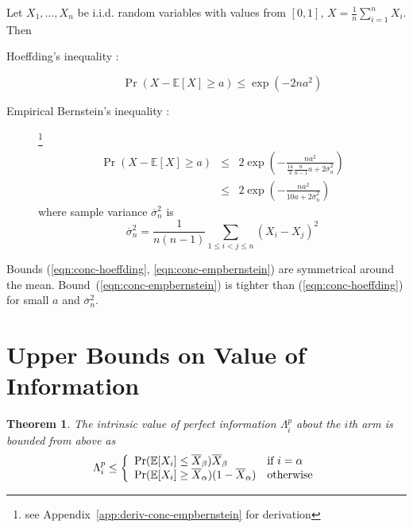 \documentclass{article}
\newcommand {\IE} {\ensuremath {\mathbb{E}}}
\newtheorem{thm}{Theorem}
\begin{document}
Let $X_1, \ldots, X_n$ be i.i.d. random variables with values from $[0,1]$,
$X=\frac 1 n \sum_{i=1}^n X_i$. Then 
\begin{description}
\item[Hoeffding's inequality \rm{\cite{Hoeffding.ineq}}:] 
\begin{equation}
\Pr(X-\IE[X] \ge a) \le \exp ( -2na^2)
\label{eqn:conc-hoeffding}
\end{equation}
\item[Empirical Bernstein's inequality
  \rm{\cite{MaurerPontil.benrstein}}:]\footnote{see
    Appendix~\ref{app:deriv-conc-empbernstein} for derivation}
\begin{eqnarray}
\Pr(X-\IE[X] \ge a) &\le& 2\exp \left( - \frac {na^2} {\frac {14} {3}
                          \frac {n} {n-1}a+2\overline\sigma_n^2}\right)\nonumber\\
                    &\le& 2\exp \left( - \frac {na^2} {10a+2\overline\sigma_n^2}\right)
\label{eqn:conc-empbernstein}
\end{eqnarray}
where sample variance $\overline\sigma_n^2$ is
\begin{equation}
\overline\sigma_n^2=\frac 1 {n(n-1)} \sum_{1\le i < j\le n}(X_i-X_j)^2
\label{eqn:sample-variance}
\end{equation}
\end{description}
Bounds (\ref{eqn:conc-hoeffding}, \ref{eqn:conc-empbernstein}) are symmetrical
around the mean. Bound~(\ref{eqn:conc-empbernstein}) is tighter than
(\ref{eqn:conc-hoeffding}) for small $a$ and $\overline\sigma_n^2$. 

\section{Upper Bounds on Value of Information}

\begin{thm} The intrinsic value of perfect information $\Lambda_i^p$ about the $i$th arm is
  bounded from above as
\begin{equation}
  \Lambda_i^p \le \left\{
  \begin{array}{l l}
    \Pr(\IE[X_i] \le \overline X_\beta)\overline X_\beta & \mbox{if $i=\alpha$} \\
    \Pr(\IE[X_i] \ge \overline X_\alpha)(1-\overline X_\alpha) & \mbox{otherwise}
  \end{array} \right.
\label{eqn:thm-vopi}
\end{equation}
\end{thm}
\end{document}
